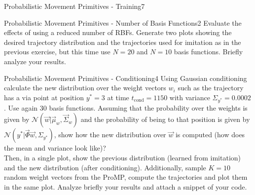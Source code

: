 \begin{questions}
\begin{question}[bonus]{Probabilistic Movement Primitives - Training}{7}
\begin{answer}\end{answer}

\end{question}


\begin{question}[bonus]{Probabilistic Movement Primitives - Number of Basis Functions}{2}
Evaluate the effects of using a reduced number of RBFs. Generate two plots showing the desired trajectory distribution and the trajectories used for imitation as in the previous exercise, but this time use $N=20$ and $N=10$ basis functions. Briefly analyze your results.

\begin{answer}\end{answer}

\end{question}



\begin{question}[bonus]{Probabilistic Movement Primitives - Conditioning}{4}
Using Gaussian conditioning calculate the new distribution over the weight vectors $w_i$ such as the trajectory has a via point at position $y^*=3$ at time $t_\textrm{cond}=1150$ with variance $\Sigma_{y^*}=0.0002$. Use again 30 basis functions.
Assuming that the probability over the weights is given by $\mathcal{N}(\vec w|\vec \mu_w,\vec \Sigma_w)$ and the probability of being to that position is given by $\mathcal{N}(y^*|\vec \Phi \vec w, \Sigma_{y^*} )$, show how the new distribution over $\vec w$ is computed (how does the mean and variance look like)?
\\
Then, in a single plot, show the previous distribution (learned from imitation) and the new distribution (after conditioning). Additionally, sample $K=10$ random weight vectors from the ProMP, compute the trajectories and plot them in the same plot. Analyze briefly your results and attach a snippet of your code.

\begin{answer}\end{answer}

\end{question}

\end{questions}
